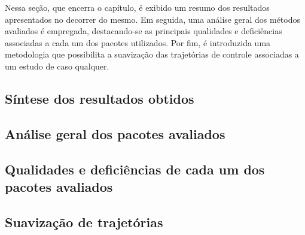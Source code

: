 Nessa seção, que encerra o capítulo, é exibido um resumo dos resultados apresentados no decorrer do mesmo. Em seguida, uma análise geral dos métodos avaliados é empregada, destacando-se as principais qualidades e deficiências associadas a cada um dos pacotes utilizados. Por fim, é introduzida uma metodologia que possibilita a suavização das trajetórias de controle associadas a um estudo de caso qualquer. 

\subsection{Síntese dos resultados obtidos}
\label{sec:resultados:conclusao:resumo}


\subsection{Análise geral dos pacotes avaliados}
\label{sec:resultados:conclusao:analiseGeral}


\subsection{Qualidades e deficiências de cada um dos pacotes avaliados}
\label{sec:resultados:conclusao:qualidadesDeficiencias}


\subsection{Suavização de trajetórias}
\label{sec:resultados:conclusao:suavizacaoTrajetorias}




